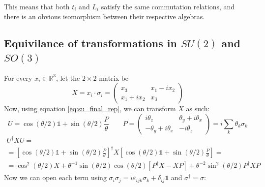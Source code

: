 \documentclass{article}
\newcommand{\R}{\ensuremath{\mathbb{R}}}
\begin{document}
This means that both $t_i$ and $L_i$ satisfy the same commutation relations, and there is an obvious isomorphism between their respective algebras.

\subsection{Equivilance of transformations in $SU(2)$ and $SO(3)$}
For every $x_i \in \R^3$, let the $2\times2$ matrix be 
\begin{equation}
    X = x_i\cdot\sigma_i = \begin{pmatrix} x_3 & x_1 - i x_2 \\ x_1 + i x_2 & x_3 \end{pmatrix}
\end{equation}
Now, using equation \ref{eq:su_final_rep}, we can transform $X$ as such:
\begin{equation}
    U = \cos(\theta/2)\mathbb{1} + \sin(\theta/2) \frac{P}{\theta}
    \qquad
    P = \begin{pmatrix}
            i\theta_z & \theta_y + i\theta_x \\
            - \theta_y+ i\theta_x & -i\theta_z
        \end{pmatrix} = i\sum_k \theta_k \sigma_k
\end{equation}
\begin{equation}
\begin{gathered}
    U^\dagger X U = \\ =
    \left[\cos(\theta/2)\mathbb{1} + \sin(\theta/2) \frac{P}{\theta}\right]^\dagger X \left[\cos(\theta/2)\mathbb{1} + \sin(\theta/2) \frac{P}{\theta}\right] = \\ =
    \cos^2(\theta/2)X + \theta^{-1}\sin(\theta/2)\cos(\theta/2)[P^\dagger X - X P] + \theta^{-2}\sin^2(\theta/2)P^\dagger X P
\end{gathered}
\end{equation}
Now we can open each term using $\sigma_i\sigma_j = i\varepsilon_{ijk}\sigma_k + \delta_{ij}\mathbb{1}$ and $\sigma^\dagger = \sigma$:
\end{document}
